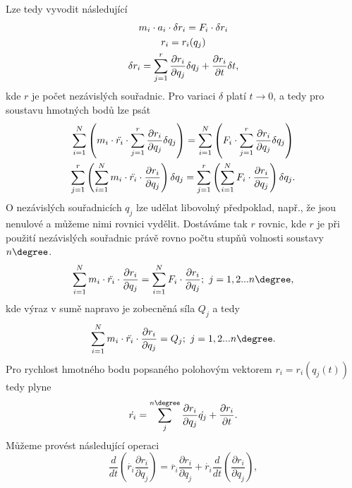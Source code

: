 Lze tedy vyvodit následující
\begin{gather}
	m_i\cdot a_i \cdot \delta r_i = F_i \cdot \delta r_i \notag\\
	r_i = r_i(q_j) \notag \\
	\delta r_i = \sum_{j=1}^{r} \frac{\partial r_i}{\partial q_j} \delta q_j + \frac{\partial r_i}{\partial t} \delta t,
\end{gather}
kde $ r $ je počet nezávislých souřadnic.
Pro variaci $ \delta $ platí $ t \rightarrow 0 $, a tedy pro soustavu hmotných bodů lze psát
\begin{gather}
	\sum_{i=1}^{N}\left( m_i\cdot \ddot{r_i} \cdot \sum_{j=1}^{r}  \frac{\partial r_i}{\partial q_j} \delta q_j \right) = \sum_{i=1}^{N} \left( F_i \cdot \sum_{j=1}^{r} \frac{\partial r_i}{\partial q_j} \delta q_j\right) \notag\\
	\sum_{j=1}^{r}\left( \sum_{i=1}^{N} m_i\cdot \ddot{r_i} \cdot   \frac{\partial r_i}{\partial q_j} \right) \delta q_j  = \sum_{j=1}^{r} \left( \sum_{i=1}^{N}F_i \cdot  \frac{\partial r_i}{\partial q_j}\right) \delta q_j .
\end{gather}
O nezávislých souřadnicích $ q_j $ lze udělat libovolný předpoklad, např., že jsou nenulové a můžeme nimi rovnici vydělit.
Dostáváme tak $ r $ rovnic, kde $ r $ je při použití nezávislých souřadnic právě rovno počtu stupňů volnosti soustavy $ n\degree $.
\begin{equation}
	\sum_{i=1}^{N} m_i\cdot \ddot{r_i} \cdot   \frac{\partial r_i}{\partial q_j}  =  \sum_{i=1}^{N}F_i \cdot  \frac{\partial r_i}{\partial q_j}; \,\, j=1,2...n\degree,
\end{equation}
kde výraz v sumě napravo je zobecněná síla $ Q_j $ a tedy
\begin{equation}
	\sum_{i=1}^{N} m_i\cdot \ddot{r_i} \cdot   \frac{\partial r_i}{\partial q_j}  =  Q_j; \,\, j=1,2...n\degree \label{eq:e21}.
\end{equation}
Pro rychlost hmotného bodu popsaného polohovým vektorem $ r_i = r_i(q_j(t)) $tedy plyne
\begin{equation}
	\dot{r_i}=\sum_{j}^{n\degree}\frac{\partial r_i}{\partial q_j}\dot{q_j}+\frac{\partial r_i}{\partial t}.
\end{equation}
Můžeme provést následující operaci
\begin{equation*}
	\frac{d}{dt}\left( \dot{r_i} \frac{\partial r_i}{\partial q_j} \right) = \ddot{r_i}\frac{\partial r_i}{\partial q_j}+\dot{r_i}\frac{d}{dt}\left( \frac{\partial r_i}{\partial q_j}\right),
\end{equation*}

